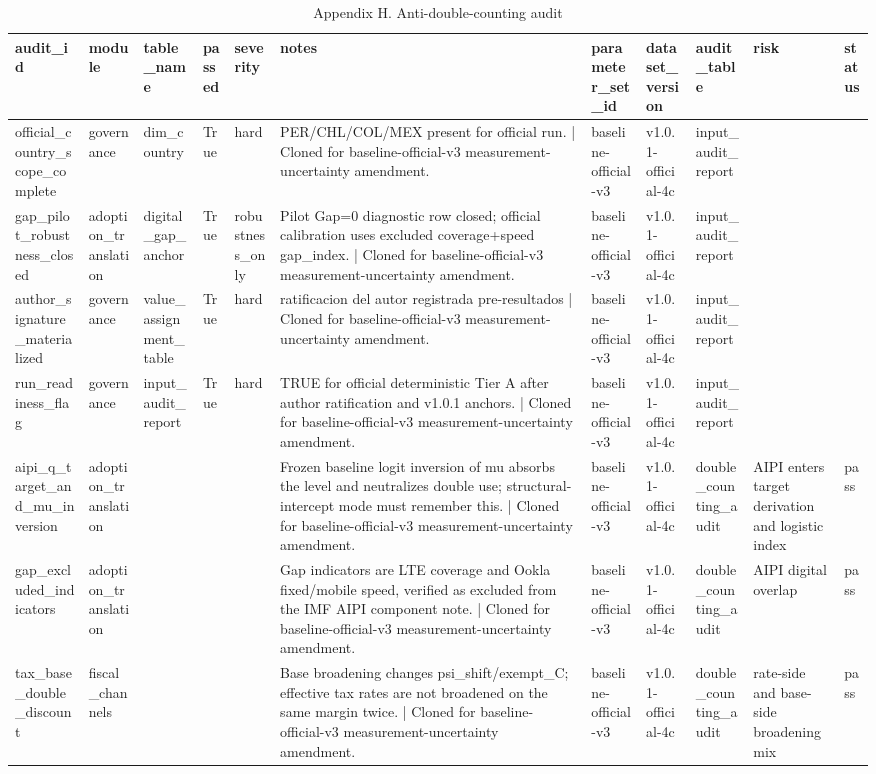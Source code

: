 \begin{table}[!htbp]
\centering
\caption{Appendix H. Anti-double-counting audit}
\begin{tabular}{lllllllllll}
\toprule
audit\_id & module & table\_name & passed & severity & notes & parameter\_set\_id & dataset\_version & audit\_table & risk & status \\
\midrule
official\_country\_scope\_complete & governance & dim\_country & True & hard & PER/CHL/COL/MEX present for official run. | Cloned for baseline-official-v3 measurement-uncertainty amendment. & baseline-official-v3 & v1.0.1-official-4c & input\_audit\_report &  &  \\
gap\_pilot\_robustness\_closed & adoption\_translation & digital\_gap\_anchor & True & robustness\_only & Pilot Gap=0 diagnostic row closed; official calibration uses excluded coverage+speed gap\_index. | Cloned for baseline-official-v3 measurement-uncertainty amendment. & baseline-official-v3 & v1.0.1-official-4c & input\_audit\_report &  &  \\
author\_signature\_materialized & governance & value\_assignment\_table & True & hard & ratificacion del autor registrada pre-resultados | Cloned for baseline-official-v3 measurement-uncertainty amendment. & baseline-official-v3 & v1.0.1-official-4c & input\_audit\_report &  &  \\
run\_readiness\_flag & governance & input\_audit\_report & True & hard & TRUE for official deterministic Tier A after author ratification and v1.0.1 anchors. | Cloned for baseline-official-v3 measurement-uncertainty amendment. & baseline-official-v3 & v1.0.1-official-4c & input\_audit\_report &  &  \\
aipi\_q\_target\_and\_mu\_inversion & adoption\_translation &  &  &  & Frozen baseline logit inversion of mu absorbs the level and neutralizes double use; structural-intercept mode must remember this. | Cloned for baseline-official-v3 measurement-uncertainty amendment. & baseline-official-v3 & v1.0.1-official-4c & double\_counting\_audit & AIPI enters target derivation and logistic index & pass \\
gap\_excluded\_indicators & adoption\_translation &  &  &  & Gap indicators are LTE coverage and Ookla fixed/mobile speed, verified as excluded from the IMF AIPI component note. | Cloned for baseline-official-v3 measurement-uncertainty amendment. & baseline-official-v3 & v1.0.1-official-4c & double\_counting\_audit & AIPI digital overlap & pass \\
tax\_base\_double\_discount & fiscal\_channels &  &  &  & Base broadening changes psi\_shift/exempt\_C; effective tax rates are not broadened on the same margin twice. | Cloned for baseline-official-v3 measurement-uncertainty amendment. & baseline-official-v3 & v1.0.1-official-4c & double\_counting\_audit & rate-side and base-side broadening mix & pass \\

\end{tabular}
\end{table}
